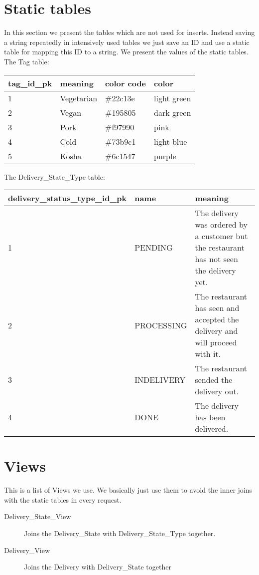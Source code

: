     \section{Static tables}
    In this section we present the tables which are not used for inserts. Instead saving a string repeatedly in intensively used tables we just save an ID and use a static table for mapping this ID to a string. We present the values of the static tables. The Tag table: 
    \begin{center}
        \begin{tabular}{|l|l|l|l|}
            \hline
            tag\_id\_pk & meaning & color code & color\\ \hline
            1 & Vegetarian & \#22c13e & light green \\ \hline
            2 & Vegan & \#195805 & dark green \\ \hline
            3 & Pork & \#f97990	& pink \\ \hline
            4 & Cold & \#73b9c1 & light blue \\ \hline
            5 & Kosha & \#6c1547 & purple \\ \hline
        \end{tabular}
    \end{center}
    The Delivery\_State\_Type table: 
    \begin{center}
        \begin{tabular}{|l|l|p{5cm}|}
            \hline
            delivery\_status\_type\_id\_pk & name & meaning \\ \hline
            1 & PENDING & The delivery was ordered by a customer but the restaurant has not seen the delivery yet. \\ \hline
            2 & PROCESSING & The restaurant has seen and accepted the delivery and will proceed with it. \\ \hline
            3 & INDELIVERY & The restaurant sended the delivery out. \\ \hline
            4 & DONE & The delivery has been delivered. \\ \hline
        \end{tabular}
    \end{center}

    \section{Views}
    This is a list of Views we use. We basically just use them to avoid the inner joins with the static tables in every request.
    \begin{description}
        \item[Delivery\_State\_View] Joins the Delivery\_State with Delivery\_State\_Type together.
        \item[Delivery\_View] Joins the Delivery with Delivery\_State together
    \end{description}
